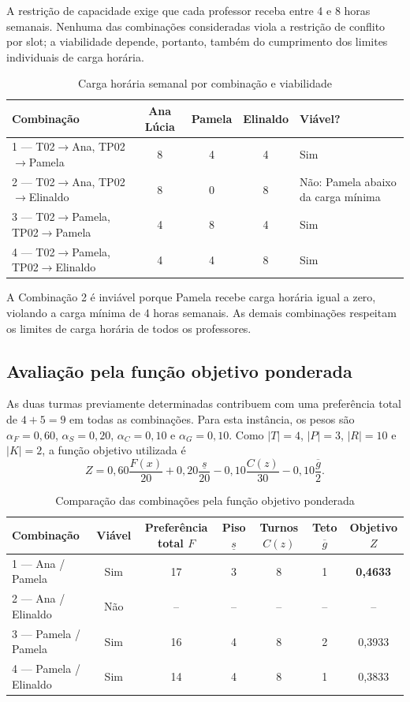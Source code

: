 \documentclass[11pt,a4paper]{article}
\begin{document}
A restrição de capacidade exige que cada professor receba entre
4 e 8 horas semanais. Nenhuma das combinações consideradas viola
a restrição de conflito por slot; a viabilidade depende, portanto,
também do cumprimento dos limites individuais de carga horária.


\begin{table}[htbp]
\centering
\caption{Carga horária semanal por combinação e viabilidade}
\label{tab:viabilidade}
\small
\begin{tabular}{lcccl}
\toprule
Combinação & Ana Lúcia & Pamela & Elinaldo & Viável? \\
\midrule
1 --- T02$\to$Ana, TP02$\to$Pamela
& 8 & 4 & 4 & Sim \\

2 --- T02$\to$Ana, TP02$\to$Elinaldo
& 8 & 0 & 8 & Não: Pamela abaixo da carga mínima \\

3 --- T02$\to$Pamela, TP02$\to$Pamela
& 4 & 8 & 4 & Sim \\

4 --- T02$\to$Pamela, TP02$\to$Elinaldo
& 4 & 4 & 8 & Sim \\
\bottomrule
\end{tabular}
\end{table}

A Combinação 2 é inviável porque Pamela recebe carga horária igual
a zero, violando a carga mínima de 4 horas semanais. As demais
combinações respeitam os limites de carga horária de todos os
professores.


\subsection{Avaliação pela função objetivo ponderada}

As duas turmas previamente determinadas contribuem com uma preferência total de $4+5=9$ em todas as combinações. Para esta instância, os pesos são $\alpha_F=0{,}60$, $\alpha_S=0{,}20$, $\alpha_C=0{,}10$ e $\alpha_G=0{,}10$. Como $|T|=4$, $|P|=3$, $|R|=10$ e $|K|=2$, a função objetivo utilizada é
\[
Z=0{,}60\frac{F(x)}{20}
+0{,}20\frac{\underline{s}}{20}
-0{,}10\frac{C(z)}{30}
-0{,}10\frac{\overline{g}}{2}.
\]

\begin{table}[htbp]
\centering
\caption{Comparação das combinações pela função objetivo ponderada}
\label{tab:resumo_final}
\small
\begin{tabular}{lcccccc}
\toprule
Combinação & Viável & Preferência total $F$
& Piso $\underline{s}$
& Turnos $C(z)$
& Teto $\overline{g}$
& Objetivo $Z$ \\
\midrule
1 --- Ana / Pamela
& Sim & 17 & 3 & 8 & 1 & \textbf{0,4633} \\

2 --- Ana / Elinaldo
& Não & -- & -- & -- & -- & -- \\

3 --- Pamela / Pamela
& Sim & 16 & 4 & 8 & 2 & 0,3933 \\

4 --- Pamela / Elinaldo
& Sim & 14 & 4 & 8 & 1 & 0,3833 \\
\bottomrule
\end{tabular}
\end{table}
\end{document}
